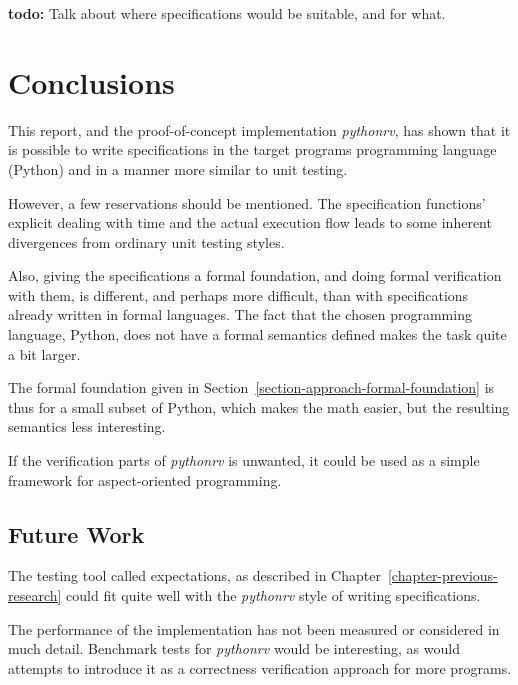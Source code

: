 \documentclass[a4paper,11pt]{kth-mag}
\newcommand{\todo}[1]{\textbf{todo: #1}}
\begin{document}
\todo{}
Talk about where specifications would be suitable, and for what.





\pagestyle{newchap}
\chapter{Conclusions} \label{chapter-conclusions}

This report, and the proof-of-concept implementation \textit{pythonrv}, has
shown that it is possible to write specifications in the target programs
programming language (Python) and in a manner more similar to unit testing.

However, a few reservations should be mentioned. The specification functions'
explicit dealing with time and the actual execution flow leads to some inherent
divergences from ordinary unit testing styles.

Also, giving the specifications a formal foundation, and doing formal
verification with them, is different, and perhaps more difficult, than with
specifications already written in formal languages. The fact that the chosen
programming language, Python, does not have a formal semantics defined makes the
task quite a bit larger.

The formal foundation given in Section~\ref{section-approach-formal-foundation}
is thus for a small subset of Python, which makes the math easier, but the
resulting semantics less interesting.

If the verification parts of \textit{pythonrv} is unwanted, it could be used as
a simple framework for aspect-oriented programming.

\section{Future Work}

The testing tool called expectations, as described in
Chapter~\ref{chapter-previous-research} could fit quite well with the
\textit{pythonrv} style of writing specifications.

The performance of the implementation has not been measured or considered in
much detail. Benchmark tests for \textit{pythonrv} would be interesting, as
would attempts to introduce it as a correctness verification approach for more
programs.
\end{document}
